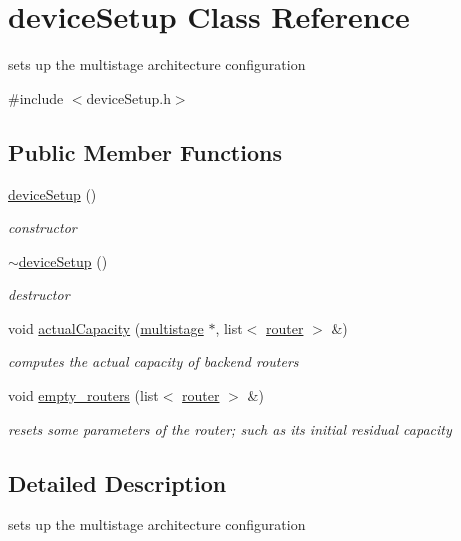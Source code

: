 \hypertarget{classdeviceSetup}{\section{device\-Setup \-Class \-Reference}
\label{classdeviceSetup}
}


sets up the multistage architecture configuration  




{\ttfamily \#include $<$device\-Setup.\-h$>$}

\subsection*{\-Public \-Member \-Functions}
\begin{DoxyCompactItemize}
\item 
\hyperlink{classdeviceSetup_aee6d5a2f08053ef7071853eaefd4ca42}{device\-Setup} ()
\begin{DoxyCompactList}\small\item\em constructor \end{DoxyCompactList}\item 
\hyperlink{classdeviceSetup_a80a771874b29d08f05f92c1b2c52c348}{$\sim$device\-Setup} ()
\begin{DoxyCompactList}\small\item\em destructor \end{DoxyCompactList}\item 
void \hyperlink{classdeviceSetup_a56a51cc81222dec1a08e1d07eafca000}{actual\-Capacity} (\hyperlink{classmultistage}{multistage} $\ast$, list$<$ \hyperlink{classrouter}{router} $>$ \&)
\begin{DoxyCompactList}\small\item\em computes the actual capacity of backend routers \end{DoxyCompactList}\item 
void \hyperlink{classdeviceSetup_a89cb8151a7b9153ea09fcfc52260bb9b}{empty\-\_\-routers} (list$<$ \hyperlink{classrouter}{router} $>$ \&)
\begin{DoxyCompactList}\small\item\em resets some parameters of the router; such as its initial residual capacity \end{DoxyCompactList}\end{DoxyCompactItemize}


\subsection{\-Detailed \-Description}
sets up the multistage architecture configuration 

